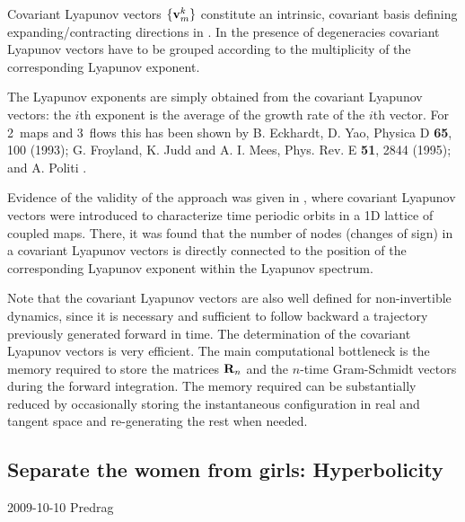 Covariant Lyapunov vectors $\{{\bf v}_{m}^k\}$ constitute an
intrinsic, covariant basis defining expanding/contracting
directions in \statesp.
In the presence of degeneracies covariant Lyapunov vectors
have to be grouped according to the multiplicity of the
corresponding Lyapunov exponent.

The Lyapunov exponents are simply obtained from the covariant
Lyapunov vectors: the $i$th exponent is the average of the
growth rate of the $i$th vector. For 2\dmn\ maps and 3\dmn\
flows this has been shown by
B. Eckhardt, D. Yao, Physica D {\bf 65}, 100 (1993);
G. Froyland, K. Judd and A. I. Mees, Phys. Rev. E {\bf 51}, 2844 (1995);
and
A. Politi \etal{}.

Evidence of the validity of the approach was given in
, where covariant Lyapunov vectors were
introduced to characterize time periodic orbits in a 1D
lattice of coupled maps. There, it was found that the number
of nodes (changes of sign) in a covariant Lyapunov vectors is
directly connected to the position of the corresponding
Lyapunov exponent within the Lyapunov spectrum.


Note that the covariant Lyapunov vectors are also well
defined for non-invertible dynamics, since it is necessary
and sufficient to follow backward a trajectory previously
generated forward in time. The determination of the covariant
Lyapunov vectors is very efficient. The main computational
bottleneck is the memory required to store the matrices ${\bf
R}_n$ and the $n$-time Gram-Schmidt vectors during the
forward integration. The memory required can be substantially
reduced by occasionally storing the instantaneous
configuration in real and tangent space and re-generating the
rest when needed.

\subsection{Separate the women from girls: Hyperbolicity}
\begin{description}
\item[2009-10-10 Predrag]
\end{description}

